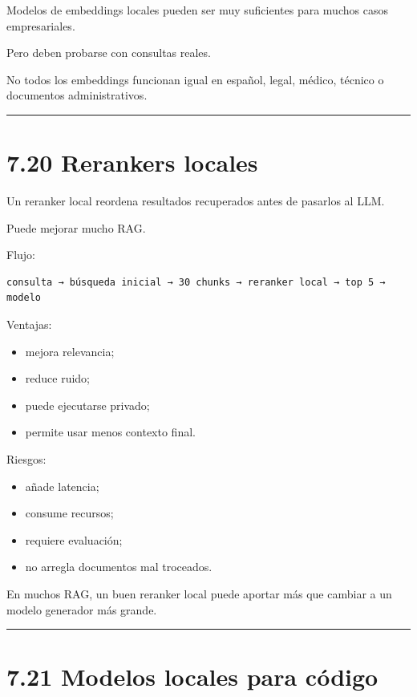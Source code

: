 Modelos de embeddings locales pueden ser muy suficientes para muchos
casos empresariales.

Pero deben probarse con consultas reales.

No todos los embeddings funcionan igual en español, legal, médico,
técnico o documentos administrativos.

\begin{center}\rule{0.5\linewidth}{0.5pt}\end{center}

\section{7.20 Rerankers locales}\label{rerankers-locales}

Un reranker local reordena resultados recuperados antes de pasarlos al
LLM.

Puede mejorar mucho RAG.

Flujo:

\begin{lstlisting}
consulta → búsqueda inicial → 30 chunks → reranker local → top 5 → modelo
\end{lstlisting}

Ventajas:

\begin{itemize}
\tightlist
\item
  mejora relevancia;
\item
  reduce ruido;
\item
  puede ejecutarse privado;
\item
  permite usar menos contexto final.
\end{itemize}

Riesgos:

\begin{itemize}
\tightlist
\item
  añade latencia;
\item
  consume recursos;
\item
  requiere evaluación;
\item
  no arregla documentos mal troceados.
\end{itemize}

En muchos RAG, un buen reranker local puede aportar más que cambiar a un
modelo generador más grande.

\begin{center}\rule{0.5\linewidth}{0.5pt}\end{center}

\section{7.21 Modelos locales para
código}\label{modelos-locales-para-cuxf3digo}

